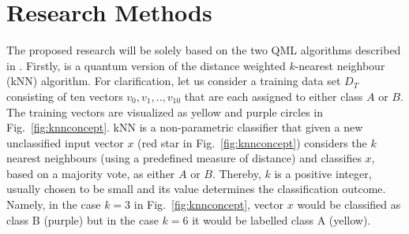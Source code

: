 \documentclass[a4paper]{article}
\newcommand*{\0}{$\ket{0}$}
\newcommand*{\1}{$\ket{1}$}
\begin{document}

\newpage
		
\section{Research Methods}
\label{sec:researchmethods}



The proposed research will be solely based on the two QML algorithms described in \cite{Schuld2014, Schuld2016}. Firstly, \cite{Schuld2014} is a quantum version of the distance weighted $k$-nearest neighbour (kNN) algorithm. For clarification, let us consider a training data set ${D}_{T}$ consisting of ten vectors ${v}_{0}, {v}_{1},..,{v}_{10}$ that are each assigned to either class $A$ or $B$. The training vectors are visualized as yellow and purple circles in Fig.~\ref{fig:knnconcept}. kNN is a non-parametric classifier that given a new unclassified input vector $x$ (red star in Fig.~\ref{fig:knnconcept}) considers the $k$ nearest neighbours (using a predefined measure of distance) and classifies $x$, based on a majority vote, as either $A$ or $B$. Thereby, $k$ is a positive integer, usually chosen to be small and its value determines the classification outcome. Namely, in the case $k = 3$ in Fig.~\ref{fig:knnconcept}, vector $x$ would be classified as class B (purple) but in the case $k = 6$ it would be labelled class A (yellow).
\end{document}
